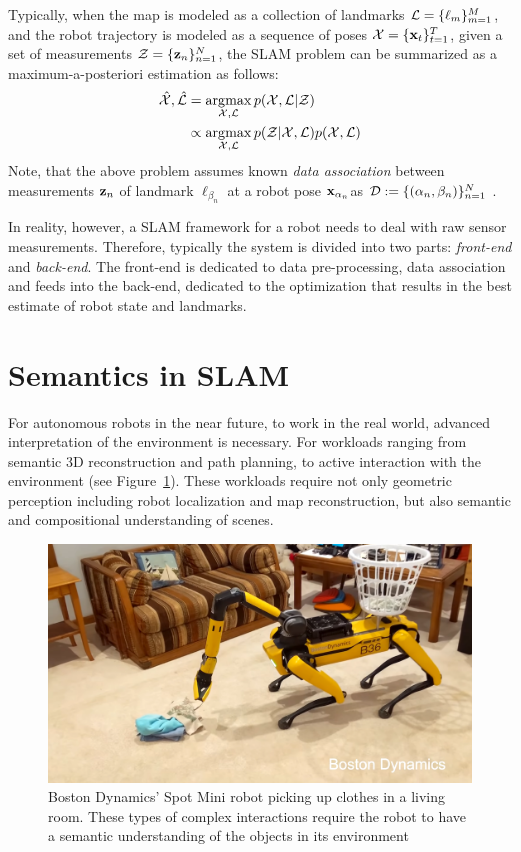 Typically, when the map is modeled as a collection of landmarks $ \mathcal{L} = \{\ell_m\}_{m=1}^{M} $, and the robot trajectory is modeled as a sequence of poses $\mathcal{X} = \{\mathbf{x}_t\}_{t=1}^{T}$, given a set of measurements $ \mathcal{Z} = \{\mathbf{z}_n\}_{n=1}^{N}$, the SLAM problem can be summarized as a maximum-a-posteriori estimation \cite{dellaertFactorGraphsRobot2017} as follows:
\begin{align}
    \hat{\mathcal{X}}, \hat{\mathcal{L}} &= \operatorname*{\arg\!\max}_{\mathcal{X}, \mathcal{L}} p(\mathcal{X}, \mathcal{L} | \mathcal{Z}) \\
                         &\propto \operatorname*{\arg\!\max}_{\mathcal{X}, \mathcal{L}} p(\mathcal{Z} | \mathcal{X}, \mathcal{L}) p(\mathcal{X}, \mathcal{L})
\end{align}
Note, that the above problem assumes known \emph{data association} between measurements $\mathbf{z}_n$ of landmark $\ell_{\beta_n}$ at a robot pose $\mathbf{x}_{\alpha_n}$as $\mathcal{D} := \{(\alpha_n, \beta_n)\}_{n=1}^{N}$ \cite{bowmanProbabilisticDataAssociation2017}.

In reality, however, a SLAM framework for a robot needs to deal with raw sensor measurements. Therefore, typically the system is divided into two parts: \emph{front-end} and \emph{back-end}. The front-end is dedicated to data pre-processing, data association and feeds into the back-end, dedicated to the optimization that results in the best estimate of robot state and landmarks.

\section{Semantics in SLAM}

For autonomous robots in the near future, to work in the real world, advanced interpretation of the environment is necessary. For workloads ranging from semantic 3D reconstruction and path planning, to active interaction with the environment (see Figure~\ref{fig:spot-mini}). These workloads require not only geometric perception including robot localization and map reconstruction, but also semantic and compositional understanding of scenes.

\begin{figure}[htpb]
    \centering
    \includegraphics[width=0.8\linewidth]{figs/Spots-Got-an-Arm.png}
    \caption{Boston Dynamics' Spot Mini robot picking up clothes in a living room. These types of complex interactions require the robot to have a semantic understanding of the objects in its environment}%
    \label{fig:spot-mini}
\end{figure}

